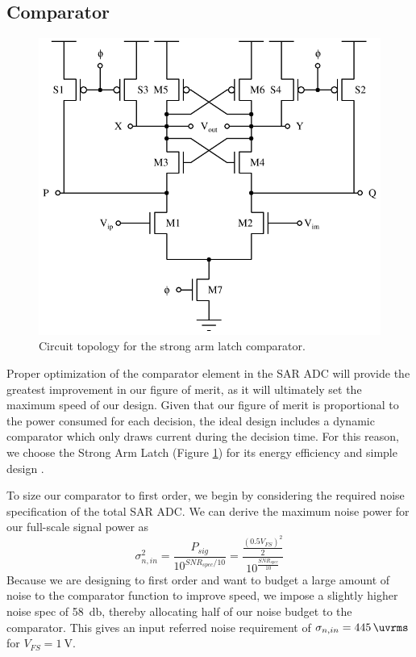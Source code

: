 \documentclass[10pt,journal]{IEEEtran}\usepackage{longtable}
\begin{document}
\subsection{Comparator}
\begin{figure}[tb]
\begin{center}
\includegraphics[width=1\columnwidth]{StrongArmLatch.pdf}
\caption{Circuit topology for the strong arm latch comparator.}
\label{fig:StrongArmLatch}
\end{center}
\end{figure}
Proper optimization of the comparator element in the SAR ADC will provide the greatest improvement in our figure of merit, as it will ultimately set the maximum speed of our design. Given that our figure of merit is proportional to the power consumed for each decision, the ideal design includes a dynamic comparator which only draws current during the decision time. For this reason, we choose the Strong Arm Latch (Figure \ref{fig:StrongArmLatch}) for its energy efficiency and simple design \cite{Razavi:bp}.

To size our comparator to first order, we begin by considering the required noise specification of the total SAR ADC. We can derive the maximum noise power for our full-scale signal power as
\begin{equation}
\sigma_{n,in}^2=\frac{P_{sig}}{10^{SNR_{spec}/10}}=\frac{\frac{\left(0.5V_{FS}\right)^2}{2}}{10^{\frac{SNR_{spec}}{10}}}
\end{equation}
Because we are designing to first order and want to budget a large amount of noise to the comparator function to improve speed, we impose a slightly higher noise spec of \SI{58}{\decibel}, thereby allocating half of our noise budget to the comparator. This gives an input referred noise requirement of $\sigma_{n,in}=\SI{445}{\uvrms}$ for $V_{FS}=\SI{1}{\volt}$.
\end{document}
